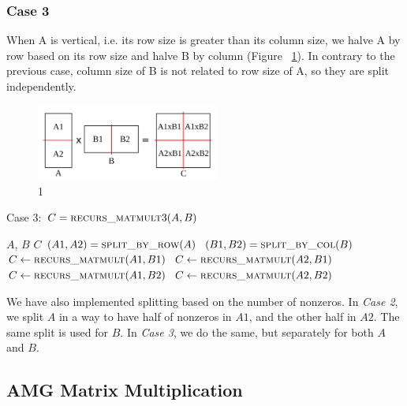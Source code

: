 \subsubsection{Case 3}
\label{sec:case3}
When A is vertical, i.e. its row size is greater than its column size, we halve A by row based on its row size and halve B by column (Figure ~\ref{fig:case3}). In contrary to the previous case, column size of B is not related to row size of A, so they are split independently.

\begin{figure}[tbh]
 \centering
 \includegraphics[width=6cm,height=2.5cm]{./figures/case3_001.pdf}
 \caption{1}
 \label{fig:case3}
\end{figure}

\begin{algorithm}[H] 
  \caption{Case 3: $C = \textsc{recurs\_matmult}3(A, B)$} \label{alg:case3} 
  \begin{algorithmic}[1]
    \Require $A$, $B$
    \Ensure  $C$
    \State $(A1, A2) = \textsc{split\_by\_row}(A)$
    \State $(B1, B2) = \textsc{split\_by\_col}(B)$
    \State $C \leftarrow \textsc{recurs\_matmult}(A1,B1)$
    \State $C \leftarrow \textsc{recurs\_matmult}(A2,B1)$
    \State $C \leftarrow \textsc{recurs\_matmult}(A1,B2)$
    \State $C \leftarrow \textsc{recurs\_matmult}(A2,B2)$
  \end{algorithmic}
\end{algorithm}

We have also implemented splitting based on the number of nonzeros. In \textit{Case 2}, we split $A$ in a way to have half of nonzeros in $A1$, and the other half in $A2$. The same split is used for $B$. In \textit{Case 3}, we do the same, but separately for both $A$ and $B$.

\subsection{AMG Matrix Multiplication}
\label{sec:amg}


